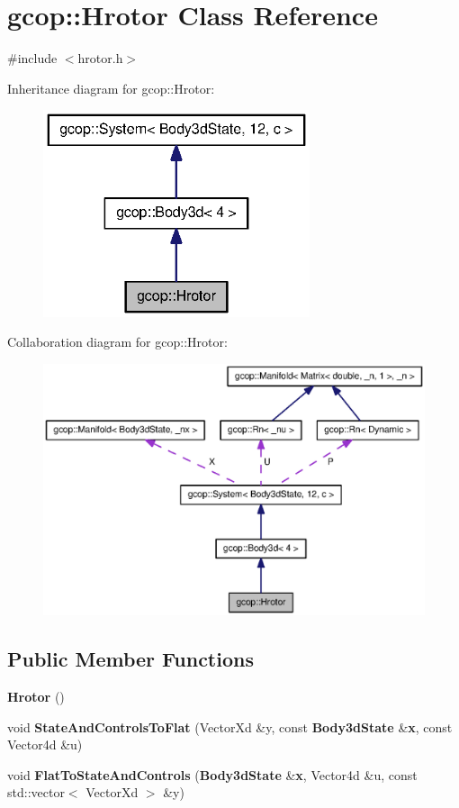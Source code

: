 \section{gcop\-:\-:\-Hrotor \-Class \-Reference}
\label{classgcop_1_1Hrotor}


{\ttfamily \#include $<$hrotor.\-h$>$}



\-Inheritance diagram for gcop\-:\-:\-Hrotor\-:\nopagebreak
\begin{figure}[H]
\begin{center}
\leavevmode
\includegraphics[width=222pt]{classgcop_1_1Hrotor__inherit__graph}
\end{center}
\end{figure}


\-Collaboration diagram for gcop\-:\-:\-Hrotor\-:\nopagebreak
\begin{figure}[H]
\begin{center}
\leavevmode
\includegraphics[width=350pt]{classgcop_1_1Hrotor__coll__graph}
\end{center}
\end{figure}
\subsection*{\-Public \-Member \-Functions}
\begin{DoxyCompactItemize}
\item 
{\bf \-Hrotor} ()
\item 
void {\bf \-State\-And\-Controls\-To\-Flat} (\-Vector\-Xd \&y, const {\bf \-Body3d\-State} \&{\bf x}, const \-Vector4d \&u)
\item 
void {\bf \-Flat\-To\-State\-And\-Controls} ({\bf \-Body3d\-State} \&{\bf x}, \-Vector4d \&u, const std\-::vector$<$ \-Vector\-Xd $>$ \&y)
\end{DoxyCompactItemize}
